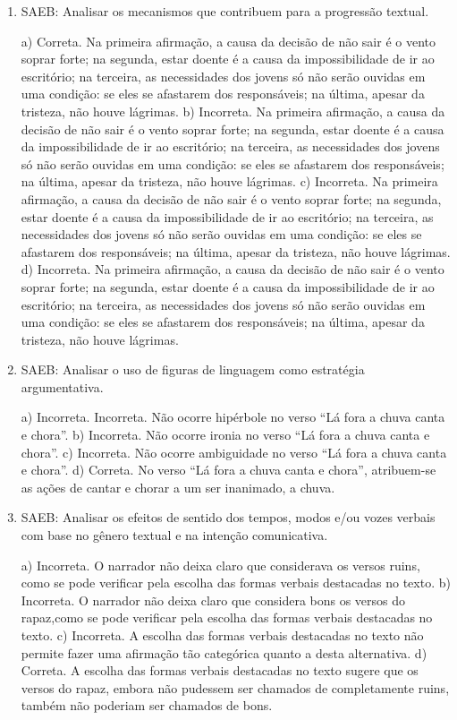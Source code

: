 \begin{enumerate}
	\item
SAEB: Analisar os mecanismos que contribuem para a progressão textual.

a) Correta. Na primeira afirmação, a causa da decisão de não sair é o vento soprar forte;
na segunda, estar doente é a causa da impossibilidade de ir ao escritório; na terceira, 
as necessidades dos jovens só não serão ouvidas em uma condição: se eles se afastarem dos
responsáveis; na última, apesar da tristeza, não houve lágrimas. 
b) Incorreta. Na primeira afirmação, a causa da decisão de não sair é o vento soprar forte;
na segunda, estar doente é a causa da impossibilidade de ir ao escritório; na terceira, 
as necessidades dos jovens só não serão ouvidas em uma condição: se eles se afastarem dos
responsáveis; na última, apesar da tristeza, não houve lágrimas.  
c) Incorreta. Na primeira afirmação, a causa da decisão de não sair é o vento soprar forte;
na segunda, estar doente é a causa da impossibilidade de ir ao escritório; na terceira, 
as necessidades dos jovens só não serão ouvidas em uma condição: se eles se afastarem dos
responsáveis; na última, apesar da tristeza, não houve lágrimas. 
d) Incorreta. Na primeira afirmação, a causa da decisão de não sair é o vento soprar forte;
na segunda, estar doente é a causa da impossibilidade de ir ao escritório; na terceira, 
as necessidades dos jovens só não serão ouvidas em uma condição: se eles se afastarem dos
responsáveis; na última, apesar da tristeza, não houve lágrimas.
	
	\item
SAEB: Analisar o uso de figuras de linguagem como estratégia argumentativa.

a) Incorreta. Incorreta. Não ocorre hipérbole no verso ``Lá fora a chuva canta e chora''.
b) Incorreta. Não ocorre ironia no verso ``Lá fora a chuva canta e chora''.
c) Incorreta. Não ocorre ambiguidade no verso ``Lá fora a chuva canta e chora''.
d) Correta. No verso ``Lá fora a chuva canta e chora'', atribuem-se as ações de cantar e chorar a um ser inanimado, a chuva.

	\item
SAEB: Analisar os efeitos de sentido dos tempos, modos e/ou vozes verbais com
base no gênero textual e na intenção comunicativa.

a) Incorreta. O narrador não deixa claro que considerava os versos ruins, como se
pode verificar pela escolha das formas verbais destacadas no texto.
b) Incorreta. O narrador não deixa claro que considera bons os versos do rapaz,como se
pode verificar pela escolha das formas verbais destacadas no texto.
c) Incorreta. A escolha das formas verbais destacadas no texto não permite fazer uma
afirmação tão categórica quanto a desta alternativa.
d) Correta. A escolha das formas verbais destacadas no texto sugere que os versos do
rapaz, embora não pudessem ser chamados de completamente ruins, também não poderiam
ser chamados de bons.
	

\end{enumerate}
